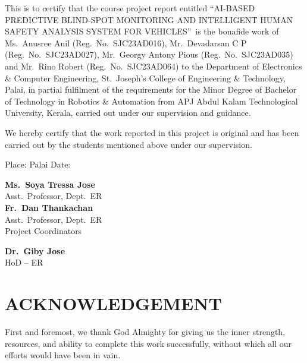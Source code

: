 \documentclass[12pt,a4paper]{report}
\newcommand{\TITLE}{AI-BASED PREDICTIVE BLIND-SPOT MONITORING AND INTELLIGENT HUMAN SAFETY ANALYSIS SYSTEM FOR VEHICLES}
\begin{document}
\noindent This is to certify that the course project report entitled \textquotedblleft\TITLE\textquotedblright\ is the bonafide work of Ms.\ Anusree Anil (Reg.\ No.\ SJC23AD016), Mr.\ Devadarsan C P (Reg.\ No.\ SJC23AD027), Mr.\ Georgy Antony Pious (Reg.\ No.\ SJC23AD035) and Mr.\ Rino Robert (Reg.\ No.\ SJC23AD064) to the Department of Electronics \& Computer Engineering, St.\ Joseph's College of Engineering \& Technology, Palai, in partial fulfilment of the requirements for the Minor Degree of Bachelor of Technology in Robotics \& Automation from APJ Abdul Kalam Technological University, Kerala, carried out under our supervision and guidance.

\vspace{8pt}
\noindent We hereby certify that the work reported in this project is original and has been carried out by the students mentioned above under our supervision.

\vspace{20pt}
\noindent Place: Palai \hfill Date: \underline{\hspace{1.2in}}

\vspace{30pt}
\noindent
\begin{minipage}[t]{0.58\textwidth}
{\bfseries Ms.\ Soya Tressa Jose}\\
Asst.\ Professor, Dept.\ ER\\[10pt]
{\bfseries Fr.\ Dan Thankachan}\\
Asst.\ Professor, Dept.\ ER\\
Project Coordinators
\end{minipage}%
\begin{minipage}[t]{0.38\textwidth}
{\bfseries Dr.\ Giby Jose}\\
HoD -- ER
\end{minipage}
\newpage

\setcounter{page}{1}
\pagestyle{frontps}

\chapter*{ACKNOWLEDGEMENT}

First and foremost, we thank God Almighty for giving us the inner strength, resources, and ability to complete this work successfully, without which all our efforts would have been in vain.
\end{document}
